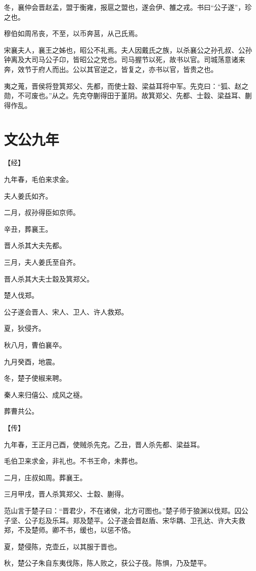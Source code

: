 \documentclass[a4paper,12pt,UTF8,twoside]{ctexbook}
\begin{document}
冬，襄仲会晋赵孟，盟于衡雍，报扈之盟也，遂会伊、雒之戎。书曰“公子遂”，珍之也。

穆伯如周吊丧，不至，以币奔莒，从己氏焉。

宋襄夫人，襄王之姊也，昭公不礼焉。夫人因戴氏之族，以杀襄公之孙孔叔、公孙钟离及大司马公子卬，皆昭公之党也。司马握节以死，故书以官。司城荡意诸来奔，效节于府人而出。公以其官逆之，皆复之，亦书以官，皆贵之也。

夷之蒐，晋侯将登箕郑父、先都，而使士縠、梁益耳将中军。先克曰：“狐、赵之勋，不可废也。”从之。先克夺蒯得田于堇阴。故箕郑父、先都、士縠、梁益耳、蒯得作乱。

\section{文公九年}



【经】

九年春，毛伯来求金。

夫人姜氏如齐。

二月，叔孙得臣如京师。

辛丑，葬襄王。

晋人杀其大夫先都。

三月，夫人姜氏至自齐。

晋人杀其大夫士縠及箕郑父。

楚人伐郑。

公子遂会晋人、宋人、卫人、许人救郑。

夏，狄侵齐。

秋八月，曹伯襄卒。

九月癸酉，地震。

冬，楚子使椒来聘。

秦人来归僖公、成风之襚。

葬曹共公。

【传】

九年春，王正月己酉，使贼杀先克。乙丑，晋人杀先都、梁益耳。

毛伯卫来求金，非礼也。不书王命，未葬也。

二月，庄叔如周。葬襄王。

三月甲戌，晋人杀箕郑父、士縠、蒯得。

范山言于楚子曰：“晋君少，不在诸侯，北方可图也。”楚子师于狼渊以伐郑。囚公子坚、公子尨及乐耳。郑及楚平。公子遂会晋赵盾、宋华耦、卫孔达、许大夫救郑，不及楚师。卿不书，缓也，以惩不恪。

夏，楚侵陈，克壶丘，以其服于晋也。

秋，楚公子朱自东夷伐陈，陈人败之，获公子茷。陈惧，乃及楚平。
\end{document}
